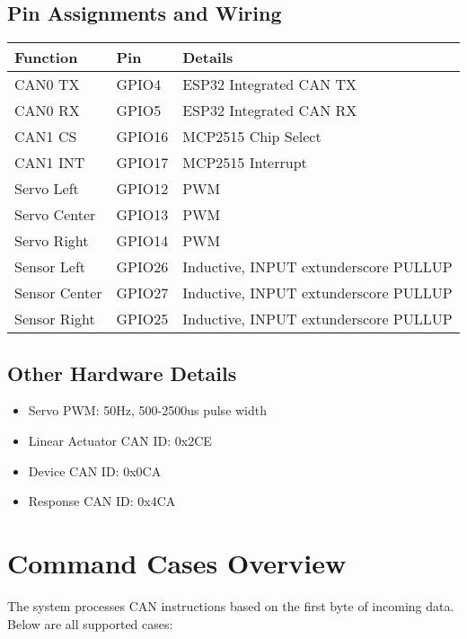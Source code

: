 \documentclass[12pt,a4paper]{article}
\begin{document}
\subsection{Pin Assignments and Wiring}
\begin{longtable}{|l|l|l|}
\hline
\textbf{Function} & \textbf{Pin} & \textbf{Details} \\
\hline
CAN0 TX           & GPIO4   & ESP32 Integrated CAN TX      \\
CAN0 RX           & GPIO5   & ESP32 Integrated CAN RX      \\
CAN1 CS           & GPIO16  & MCP2515 Chip Select          \\
CAN1 INT          & GPIO17  & MCP2515 Interrupt            \\
Servo Left        & GPIO12  & PWM                          \\
Servo Center      & GPIO13  & PWM                          \\
Servo Right       & GPIO14  & PWM                          \\
Sensor Left       & GPIO26  & Inductive, INPUT	extunderscore PULLUP      \\
Sensor Center     & GPIO27  & Inductive, INPUT	extunderscore PULLUP      \\
Sensor Right      & GPIO25  & Inductive, INPUT	extunderscore PULLUP      \\
\hline
\end{longtable}

\subsection{Other Hardware Details}
\begin{itemize}
    \item Servo PWM: 50Hz, 500-2500us pulse width
    \item Linear Actuator CAN ID: 0x2CE
    \item Device CAN ID: 0x0CA
    \item Response CAN ID: 0x4CA
\end{itemize}

\section{Command Cases Overview}
The system processes CAN instructions based on the first byte of incoming data. Below are all supported cases:
\end{document}
